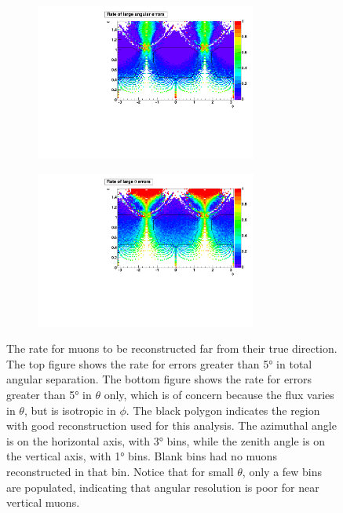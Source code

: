 \documentclass[herrin-thesis.tex]{subfiles}
\begin{document}
 \begin{figure}[htpb]
 \centering
 \begin{subfigure}[b]{1.0\textwidth}
 \centering
 \includegraphics[width=0.8\textwidth]{./plots/muon_misrecon_ang_rate.pdf}
 \end{subfigure}
  \begin{subfigure}[b]{1.0\textwidth}
  \centering
   \includegraphics[width=0.8\textwidth]{./plots/muon_misrecon_theta_rate.pdf}
  \end{subfigure}
 \caption[Rate of poorly reconstructed muons]{The rate for muons to be reconstructed far from their true direction. The top figure shows the rate for  errors greater than \ang{5} in total angular separation. The bottom figure shows the rate for errors greater than \ang{5} in \(\theta\) only, which is of concern because the flux varies in \(\theta\), but is isotropic in \(\phi\). The black polygon indicates the region with good reconstruction used for this analysis. The azimuthal angle is on the horizontal axis, with \ang{3} bins, while the zenith angle is on the vertical axis, with \ang{1} bins. Blank bins had no muons reconstructed in that bin. Notice that for small \(\theta\), only a few bins are populated, indicating that angular resolution is poor for near vertical muons.}
 \label{fig:muon_misrecon_rate}
 \end{figure}
\end{document}
